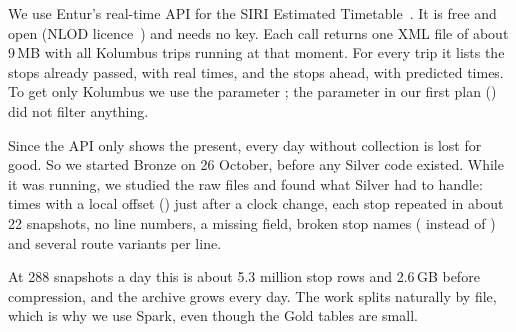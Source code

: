 We use Entur's real-time API for the SIRI Estimated Timetable~\cite{entur}. It is free and
open (NLOD licence~\cite{nlod}) and needs no key. Each call returns one XML file of about 9\,MB
with all Kolumbus trips running at that moment. For every trip it lists the stops already
passed, with real times, and the stops ahead, with predicted times. To get only Kolumbus we
use the parameter ; the parameter in our first plan
() did not filter anything.

Since the API only shows the present, every day without collection is lost for good. So we
started Bronze on 26 October, before any Silver code existed. While it was running, we studied
the raw files and found what Silver had to handle: times with a local offset ()
just after a clock change, each stop repeated in about 22 snapshots, no line numbers, a missing
 field, broken stop names ( instead of ) and several route
variants per line.

At 288 snapshots a day this is about 5.3 million stop rows and 2.6\,GB before compression,
and the archive grows every day. The work splits naturally by file, which is why we use Spark,
even though the Gold tables are small.
